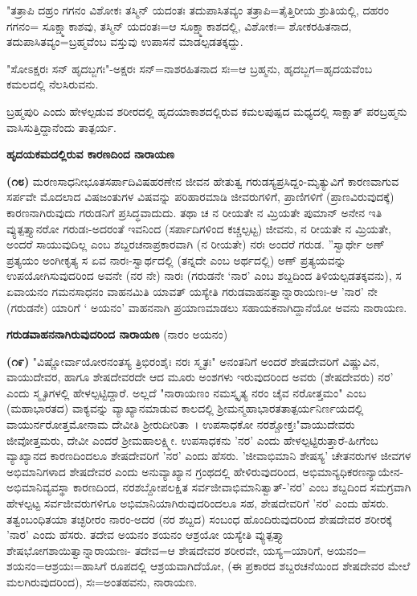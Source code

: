 "ತತ್ರಾಪಿ ದಹ್ರಂ ಗಗನಂ ವಿಶೋಕಃ ತಸ್ಮಿನ್ ಯದಂತಃ ತದುಪಾಸಿತವ್ಯಂ ತತ್ರಾಪಿ=\break ತೈತ್ತಿರೀಯ ಶ್ರುತಿಯಲ್ಲಿ, ದಹರಂ ಗಗನಂ= ಸೂಕ್ಷ್ಮಾಕಾಶವು, ತಸ್ಮಿನ್ ಯದಂತಃ=ಆ ಸೂಕ್ಷ್ಮಾಕಾಶದಲ್ಲಿ, ವಿಶೋಕಃ= ಶೋಕರಹಿತನಾದ, ತದುಪಾಸಿತವ್ಯಂ=ಬ್ರಹ್ಮವೆಂಬ ವಸ್ತುವು ಉಪಾಸನೆ ಮಾಡಲ್ಪಡತಕ್ಕದ್ದು.

"ಸೋಽಕ್ಷರಃ ಸನ್ ಹೃದಬ್ಜಗಃ"-ಅಕ್ಷರಃ ಸನ್=ನಾಶರಹಿತನಾದ ಸಃ=ಆ ಬ್ರಹ್ಮನು, ಹೃದಬ್ಜಗ=ಹೃದಯವೆಂಬ ಕಮಲದಲ್ಲಿ ನೆಲಸಿರುವನು.

ಬ್ರಹ್ಮಪುರಿ ಎಂದು ಹೇಳಲ್ಪಡುವ ಶರೀರದಲ್ಲಿ ಹೃದಯಾಕಾಶದಲ್ಲಿರುವ ಕಮಲಪುಷ್ಪದ ಮಧ್ಯದಲ್ಲಿ ಸಾಕ್ಷಾತ್ ಪರಬ್ರಹ್ಮನು ವಾಸಿಸುತ್ತಿದ್ದಾನೆಂದು ತಾತ್ಪರ್ಯ.

\begin{center}
\textbf{ಹೃದಯಕಮದಲ್ಲಿರುವ ಕಾರಣದಿಂದ ನಾರಾಯಣ}
\end{center}

\textbf{(೧೮)} ಮರಣಸಾಧನೀಭೂತಸರ್ಪಾದಿವಿಷಹರಣೇನ ಜೀವನ ಹೇತುತ್ವ ಗರುಡಸ್ಯ\break ಪ್ರಸಿದ್ದಂ-ಮೃತ್ಯುವಿಗೆ ಕಾರಣವಾಗುವ ಸರ್ಪವೇ ಮೊದಲಾದ ವಿಷಜಂತುಗಳ ವಿಷವನ್ನು ಪರಿಹಾರಮಾಡಿ ಜೀವರುಗಳಿಗೆ, ಪ್ರಾಣಿಗಳಿಗೆ (ಪ್ರಾಣವಿರುವುದಕ್ಕೆ) ಕಾರಣನಾಗಿರುವುದು ಗರುಡನಿಗೆ ಪ್ರಸಿದ್ಧವಾದುದು. ತಥಾ ಚ ನ ರೀಯತೇ ನ ಮ್ರಿಯತೇ ಪುಮಾನ್ ಅನೇನ ಇತಿ ವ್ಯುತ್ಪತ್ತ್ಯಾನರೋ ಗರುಡಃ-ಅದರಂತೆ ಇವನಿಂದ (ಸರ್ಪಾದಿಗಳಿಂದ ಕಚ್ಚಲ್ಪಟ್ಟ) ಜೀವನು, ನ ರೀಯತೇ ನ ಮ್ರಿಯತೇ, ಅಂದರೆ ಸಾಯುವುದಿಲ್ಲ ಎಂಬ ಶಬ್ದರಚನಾಪ್ರಕಾರವಾಗಿ (ನ ರೀಯತೇ) ನರಃ ಅಂದರೆ ಗರುಡ. ''ಸ್ವಾರ್ಥೇ ಅಣ್ ಪ್ರತ್ಯಯಂ ಅಂಗೀಕೃತ್ಯ ಸ ಏವ ನಾರಃ-\-ಸ್ವಾರ್ಥದಲ್ಲಿ (ತನ್ನದೇ ಎಂಬ ಅರ್ಥದಲ್ಲಿ) ಅಣ್ ಪ್ರತ್ಯಯವನ್ನು ಉಪಯೋಗಿಸುವುದರಿಂದ ಅವನೇ (ನರ ನೇ) ನಾರಃ (ಗರುಡನೇ `ನಾರ' ಎಂಬ ಶಬ್ದದಿಂದ ತಿಳಿಯಲ್ಪಡತಕ್ಕವನು), ಸ ಏವಾಯನಂ ಗಮನಸಾಧನಂ ವಾಹನಮಿತಿ ಯಾವತ್‌ ಯಸ್ಯೇತಿ ಗರುಡವಾಹನತ್ವಾನ್ನಾರಾಯಣಃ-ಆ 'ನಾರ' ನೇ (ಗರುಡನೇ) ಯಾರಿಗೆ ` ಅಯನಂ' ವಾಹನನಾಗಿ ಪ್ರಯಾಣಮಾಡಲು ಸಹಾಯಕನಾಗಿದ್ದಾನೆಯೋ ಅವನು ನಾರಾಯಣ.

\begin{center}
\textbf{ಗರುಡವಾಹನನಾಗಿರುವುದರಿಂದ ನಾರಾಯಣ} (ನಾರಂ ಅಯನಂ)
\end{center}

\textbf{(೧೯)} "ವಿಷ್ಣೋರ್ವಾಯೋರನಂತಸ್ಯ ತ್ರಿಭಿರಂಶೈಃ ನರಃ ಸ್ಮೃತಃ" ಅನಂತನಿಗೆ ಅಂದರೆ ಶೇಷದೇವರಿಗೆ ವಿಷ್ಣುವಿನ, ವಾಯುದೇವರ, ಹಾಗೂ ಶೇಷದೇವರದೇ ಆದ ಮೂರು ಅಂಶಗಳು ಇರುವುದರಿಂದ ಅವರು (ಶೇಷದೇವರು) ನರ' ಎಂದು ಸ್ಮೃತಿಗಳಲ್ಲಿ ಹೇಳಲ್ಪಟ್ಟಿದ್ದಾರೆ. ಅಲ್ಲದೆ "ನಾರಾಯಣಂ ನಮಸ್ಕೃತ್ಯ ನರಂ ಚೈವ ನರೋತ್ತಮಂ" ಎಂಬ (ಮಹಾಭಾರತದ) ವಾಕ್ಯವನ್ನು ವ್ಯಾಖ್ಯಾನಮಾಡುವ ಕಾಲದಲ್ಲಿ ಶ‍್ರೀಮನ್ಮಹಾಭಾರತತಾತ್ಪರ್ಯನಿರ್ಣಯದಲ್ಲಿ ವಾಯುರ್ನರೋತ್ತಮೋನಾಮ ದೇವೀತಿ ಶ‍್ರೀರುದೀರಿತಾ~। ಉಪಸಾಧಕೋ ನರಶ್ಚೋಕ್ತಃ"\break ವಾಯುದೇವರು ಜೀವೋತ್ತಮರು, ದೇವೀ ಎಂದರೆ ಶ‍್ರೀಮಹಾಲಕ್ಷ್ಮೀ. ಉಪಸಾಧಕನು 'ನರ' ಎಂದು ಹೇಳಲ್ಪಟ್ಟಿರುತ್ತಾರೆ-ಹೀಗೆಂಬ ವ್ಯಾಖ್ಯಾನದ ಕಾರಣದಿಂದಲೂ ಶೇಷದೇವರಿಗೆ 'ನರ' ಎಂದು ಹೆಸರು. 'ಜೀವಾಭಿಮಾನಿ ಶೇಷಸ್ಯ' ಚೇತನರುಗಳ ಜೀವಗಳ ಅಭಿಮಾನಿಗಳಾದ ಶೇಷದೇವರ ಎಂದು ಅನುವ್ಯಾಖ್ಯಾನ ಗ್ರಂಥದಲ್ಲಿ ಹೇಳಿರುವುದರಿಂದ, ಅಭಿಮಾನ್ಯಧಿಕರಣ\-ನ್ಯಾಯೇನ-ಅಭಿಮಾನಿವ್ಯವಸ್ಥಾ ಕಾರಣದಿಂದ, ನರಶಬ್ದೋಪಲಕ್ಷಿತ ಸರ್ವಜೀವಾಭಿಮಾನಿ\-ತ್ವಾತ್-'ನರ' ಎಂಬ ಶಬ್ದದಿಂದ ಸಮಗ್ರವಾಗಿ ಹೇಳಲ್ಪಟ್ಟ ಸರ್ವಜೀವರುಗಳಿಗೂ ಅಭಿಮಾನಿಯಾಗಿರುವುದರಿಂದಲೂ ಸಹ, ಶೇಷದೇವರಿಗೆ 'ನರ' ಎಂದು ಹೆಸರು. ತತ್ವಂಬಂಧಿತಯಾ ತಚ್ಛರೀರಂ ನಾರಂ-ಅದರ (ನರ ಶಬ್ದದ) ಸಂಬಂಧ ಹೊಂದಿರುವುದರಿಂದ ಶೇಷದೇವರ ಶರೀರಕ್ಕೆ 'ನಾರ' ಎಂದು ಹೆಸರು. ತದೇವ ಅಯನಂ ಶಯನಂ ಆಶ್ರಯೋ ಯಸ್ಯೇತಿ ವ್ಯುತ್ಪತ್ತ್ಯಾ ಶೇಷಭೋಗಶಾಯಿತ್ವಾನ್ನಾರಾಯಣಃ- ತದೇವ=ಆ ಶೇಷದೇವರ ಶರೀರವೇ, ಯಸ್ಯ=\break ಯಾರಿಗೆ, ಅಯನಂ= ಶಯನಂ=ಆಶ್ರಯಃ=ಹಾಸಿಗೆ ರೂಪದಲ್ಲಿ ಆಶ್ರಯವಾಗಿದೆಯೋ, (ಈ ಪ್ರಕಾರದ ಶಬ್ದರಚನೆಯಿಂದ ಶೇಷದೇವರ ಮೇಲೆ ಮಲಗಿರುವುದರಿಂದ), ಸಃ=ಅಂತಹವನು, ನಾರಾಯಣ.

